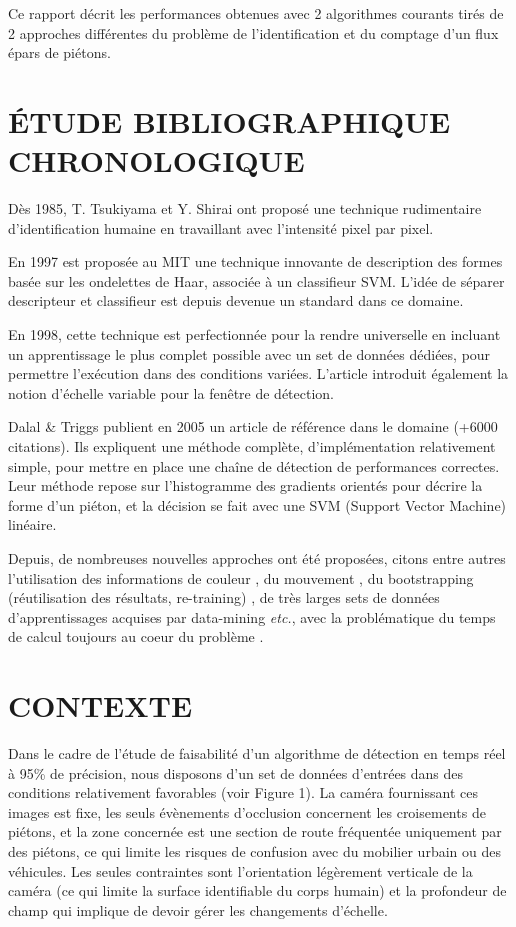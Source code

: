 \documentclass{article}
\begin{document}
	Ce rapport décrit les performances obtenues avec 2 algorithmes courants tirés de 2 approches différentes du problème de l'identification et du comptage d'un flux épars de piétons.

\section{\'{E}TUDE BIBLIOGRAPHIQUE CHRONOLOGIQUE}
\label{sec:bib}

	Dès 1985, T. Tsukiyama et Y. Shirai \cite{TV} ont proposé une technique rudimentaire d'identification humaine en travaillant avec l'intensité pixel par pixel.

	En 1997 est proposée au MIT \cite{Wavelet} une technique innovante de description des formes basée sur les ondelettes de Haar, associée à un classifieur SVM. L'idée de séparer descripteur et classifieur est depuis devenue un standard dans ce domaine.

	En 1998, cette technique est perfectionnée \cite{trainableDet} pour la rendre universelle en incluant un apprentissage le plus complet possible avec un set de données dédiées, pour permettre l'exécution dans des conditions variées. L'article introduit également la notion d'échelle variable pour la fenêtre de détection.

	Dalal \& Triggs \cite{HOG} publient en 2005 un article de référence dans le domaine (+6000 citations). Ils expliquent une méthode complète, d'implémentation relativement simple, pour mettre en place une chaîne de détection de performances correctes. Leur méthode repose sur l'histogramme des gradients orientés pour décrire la forme d'un piéton, et la décision se fait avec une SVM (Support Vector Machine) linéaire.

	Depuis, de nombreuses nouvelles approches ont été proposées, citons entre autres l'utilisation des informations de couleur \cite{NewPedDet}, du mouvement \cite{VJones}, du bootstrapping (réutilisation des résultats, re-training) \cite{NewPedDet}, de très larges sets de données d'apprentissages acquises par data-mining \cite{FeatMining}  \textit{etc.}, avec la problématique du temps de calcul toujours au coeur du problème \cite{cowboy}.


\section{CONTEXTE}
\label{sec:contexte}

	Dans le cadre de l'étude de faisabilité d'un algorithme de détection en temps réel à 95\% de précision, nous disposons d'un set de données d'entrées dans des conditions relativement favorables (voir Figure 1). La caméra fournissant ces images est fixe, les seuls évènements d'occlusion concernent les croisements de piétons, et la zone concernée est une section de route fréquentée uniquement par des piétons, ce qui limite les risques de confusion avec du mobilier urbain ou des véhicules. Les seules contraintes sont l'orientation légèrement verticale de la caméra (ce qui limite la surface identifiable du corps humain) et la profondeur de champ qui implique de devoir gérer les changements d'échelle.
	
\end{document}
